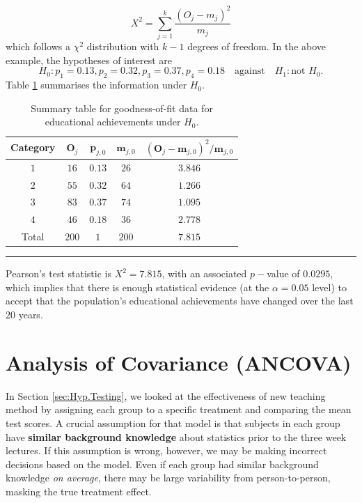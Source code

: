 \begin{equation*}
    X^{2}=\sum_{j=1}^{k}\frac{(O_{j}-m_{j})^{2}}{m_{j}}    
\end{equation*}
which follows a $\chi^{2}$ distribution with $k-1$ degrees of freedom.
\newl In the above example, the hypotheses of interest are $$H_{0}: p_{1}=0.13,p_{2}=0.32,p_{3}=0.37,p_{4}=0.18\quad\mbox{against}\quad H_{1}: \text{not } H_{0}.$$ Table  \ref{tab:SA7} summarises the information under $H_{0}$.
     \begin{table}[!t]
         \centering
         \begin{tabular}{c c c c c}
         \hline
        \textbf{Category} & $\bm{O}_{j}$ & $\bm{p}_{j,0}$ & $\bm{m}_{j,0}$ & $(\bm{O}_{j}-\bm{m}_{j,0})^2/\bm{m}_{j,0}$  \\
         \hline
        $1$ & $16$ & $0.13$ & $26$ & $3.846$ \\
        $2$ & $55$ & $0.32$ & $64$ & $1.266$ \\
        $3$ & $83$ & $0.37$ & $74$ & $1.095$ \\
        $4$ & $46$ & $0.18$ & $36$ & $2.778$ \\
        \hline
        Total & $200$ & $1$ & $200$ & $7.815$\\
        \hline
         \end{tabular}
         \caption[\small Summary table for goodness-of-fit data for educational achievements]{\small Summary table for goodness-of-fit data for educational achievements under $H_0$.}
         \label{tab:SA7}\hrule
     \end{table}
Pearson's test statistic is $X^{2}=7.815$, with an associated $p-$value of $0.0295$, which implies that there is enough statistical  evidence (at the $\alpha=0.05$ level) to accept that the population's educational achievements have changed over the last 20 years.



\section{Analysis of Covariance (ANCOVA)}
In Section \ref{sec:Hyp.Testing}, we looked at the effectiveness of new teaching method by assigning each group to a specific treatment and comparing the mean test scores. A crucial assumption for that model is that subjects in each group have \textbf{similar background knowledge} about statistics prior to the three week lectures. If this assumption is wrong, however, we may be making incorrect decisions based on the model. Even if each group had similar background knowledge \textit{on average}, there may be large variability from person-to-person, masking the true treatment effect.

